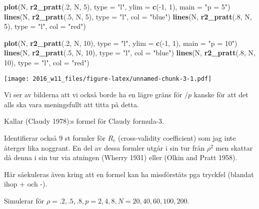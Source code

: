 \documentclass[]{article}
\newenvironment{Shaded}{\begin{snugshade}}{\end{snugshade}}
\newcommand{\KeywordTok}[1]{\textcolor[rgb]{0.13,0.29,0.53}{\textbf{{#1}}}}
\newcommand{\DataTypeTok}[1]{\textcolor[rgb]{0.13,0.29,0.53}{{#1}}}
\newcommand{\DecValTok}[1]{\textcolor[rgb]{0.00,0.00,0.81}{{#1}}}
\newcommand{\StringTok}[1]{\textcolor[rgb]{0.31,0.60,0.02}{{#1}}}
\newcommand{\NormalTok}[1]{{#1}}
\begin{document}
\begin{Shaded}
\begin{Highlighting}[]
\KeywordTok{plot}\NormalTok{(N, }\KeywordTok{r2_pratt}\NormalTok{(.}\DecValTok{2}\NormalTok{, N, }\DecValTok{5}\NormalTok{), }\DataTypeTok{type =} \StringTok{"l"}\NormalTok{, }\DataTypeTok{ylim =} \KeywordTok{c}\NormalTok{(-}\DecValTok{1}\NormalTok{, }\DecValTok{1}\NormalTok{), }\DataTypeTok{main =} \StringTok{"p = 5"}\NormalTok{)}
\KeywordTok{lines}\NormalTok{(N, }\KeywordTok{r2_pratt}\NormalTok{(.}\DecValTok{5}\NormalTok{, N, }\DecValTok{5}\NormalTok{), }\DataTypeTok{type =} \StringTok{"l"}\NormalTok{, }\DataTypeTok{col =} \StringTok{"blue"}\NormalTok{)}
\KeywordTok{lines}\NormalTok{(N, }\KeywordTok{r2_pratt}\NormalTok{(.}\DecValTok{8}\NormalTok{, N, }\DecValTok{5}\NormalTok{), }\DataTypeTok{type =} \StringTok{"l"}\NormalTok{, }\DataTypeTok{col =} \StringTok{"red"}\NormalTok{)}

\KeywordTok{plot}\NormalTok{(N, }\KeywordTok{r2_pratt}\NormalTok{(.}\DecValTok{2}\NormalTok{, N, }\DecValTok{10}\NormalTok{), }\DataTypeTok{type =} \StringTok{"l"}\NormalTok{, }\DataTypeTok{ylim =} \KeywordTok{c}\NormalTok{(-}\DecValTok{1}\NormalTok{, }\DecValTok{1}\NormalTok{), }\DataTypeTok{main =} \StringTok{"p = 10"}\NormalTok{)}
\KeywordTok{lines}\NormalTok{(N, }\KeywordTok{r2_pratt}\NormalTok{(.}\DecValTok{5}\NormalTok{, N, }\DecValTok{10}\NormalTok{), }\DataTypeTok{type =} \StringTok{"l"}\NormalTok{, }\DataTypeTok{col =} \StringTok{"blue"}\NormalTok{)}
\KeywordTok{lines}\NormalTok{(N, }\KeywordTok{r2_pratt}\NormalTok{(.}\DecValTok{8}\NormalTok{, N, }\DecValTok{10}\NormalTok{), }\DataTypeTok{type =} \StringTok{"l"}\NormalTok{, }\DataTypeTok{col =} \StringTok{"red"}\NormalTok{)}
\end{Highlighting}
\end{Shaded}

\texttt{[image: 2016\_w11\_files/figure-latex/unnamed-chunk-3-1.pdf]}

Vi ser av bilderna att vi också borde ha en lägre gräns för \(/p\)
kanske för att det alls ska vara meningsfullt att titta på detta.

Kallar (Claudy 1978):s formel för Claudy formula-3.

Identifierar också 9 st formler för \(R_c\) (cross-validity coefficient)
som jag inte återger lika noggrant. En del av dessa formler utgår i sin
tur från \(\rho^2\) men skattar då denna i sin tur via atningen (Wherry
1931) eller (Olkin and Pratt 1958).

Här såekuleras även kring att en formel kan ha missförståts pga tryckfel
(blandat ihop + och -).

Simulerar för
\(\rho = .2, .5, .8, p = 2, 4, 8, N = 20, 40, 60, 100, 200\).
\end{document}
